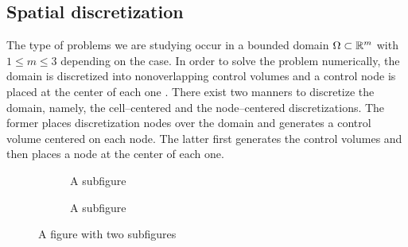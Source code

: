 
\subsection{Spatial discretization}

The type of problems we are studying occur in a bounded domain $\Omega \subset \mathbb{R}^m$ with $1 \leq m \leq 3$ depending on the case. In order to solve the problem numerically, the domain is discretized into nonoverlapping control volumes and a control node is placed at the center of each one \cite{patankar2018numerical}. There exist two manners to discretize the domain, namely, the cell--centered and the node--centered discretizations. The former places discretization nodes over the domain and generates a control volume centered on each node. The latter first generates the control volumes and then places a node at the center of each one.

\begin{figure}[h]
	\centering
	\begin{subfigure}{.5\textwidth}
		\centering
		\caption{A subfigure}
		\label{fig:sub1}
	\end{subfigure}%
	\begin{subfigure}{.5\textwidth}
		\centering
		\caption{A subfigure}
		\label{fig:sub2}
	\end{subfigure}
	\caption{A figure with two subfigures}
	\label{fig:face_node_centered_discretization_comparison}
\end{figure}